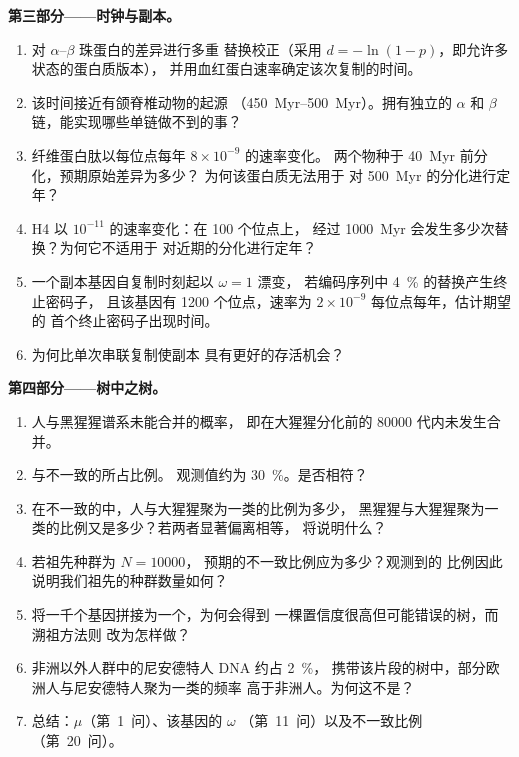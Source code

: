 \begin{problem}
\medskip
\noindent\textbf{第三部分——时钟与副本。}
\begin{enumerate}[resume]
  \item 对 $\alpha$--$\beta$ 珠蛋白的差异进行多重
        替换校正（采用 $d = -\ln(1 - p)$，即允许多状态的蛋白质版本），
        并用血红蛋白速率确定该次复制的时间。
  \item 该时间接近有颌脊椎动物的起源
        （\qtyrange{450}{500}{Myr}）。拥有独立的 $\alpha$
        和 $\beta$ 链，能实现哪些单链做不到的事？
  \item 纤维蛋白肽以每位点每年 $8\times 10^{-9}$ 的速率变化。
        两个物种于 \qty{40}{Myr} 前分化，预期原始差异为多少？
        为何该蛋白质无法用于
        对 \qty{500}{Myr} 的分化进行定年？
  \item {} H4 以 $10^{-11}$ 的速率变化：在 100 个位点上，
        经过 \qty{1000}{Myr} 会发生多少次替换？为何它不适用于
        对近期的分化进行定年？
  \item 一个副本基因自复制时刻起以 $\omega = 1$ 漂变，
        若编码序列中 \qty{4}{\%} 的替换产生终止密码子，
        且该基因有 1200 个位点，速率为 $2\times
        10^{-9}$ 每位点每年，估计期望的
        首个终止密码子出现时间。
  \item 为何比单次串联复制使副本
        具有更好的存活机会？
\end{enumerate}

\medskip
\noindent\textbf{第四部分——树中之树。}
\begin{enumerate}[resume]
  \item 人与黑猩猩谱系未能合并的概率，
        即在大猩猩分化前的 \num{80000} 代内未发生合并。
  \item 与不一致的所占比例。
        观测值约为 \qty{30}{\%}。是否相符？
  \item 在不一致的中，人与大猩猩聚为一类的比例为多少，
        黑猩猩与大猩猩聚为一类的比例又是多少？若两者显著偏离相等，
        将说明什么？
  \item 若祖先种群为 $N = \num{10000}$，
        预期的不一致比例应为多少？观测到的
        比例因此说明我们祖先的种群数量如何？
  \item 将一千个基因拼接为一个，为何会得到
        一棵置信度很高但可能错误的树，而溯祖方法则
        改为怎样做？
  \item 非洲以外人群中的尼安德特人 DNA 约占 \qty{2}{\%}，
        携带该片段的树中，部分欧洲人与尼安德特人聚为一类的频率
        高于非洲人。为何这不是？
  \item 总结：$\mu$（第~1~问）、该基因的 $\omega$
        （第~11~问）以及不一致比例（第~20~问）。
\end{enumerate}
\end{problem}
